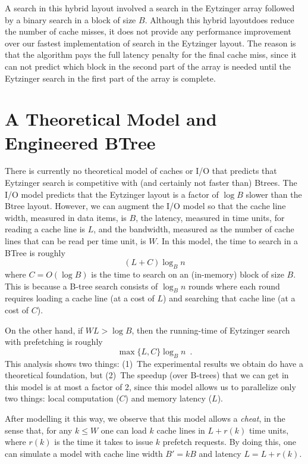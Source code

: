 \documentclass{patmorin}
\begin{document}
A search in this hybrid layout involved a search in the Eytzinger array
followed by a binary search in a block of size $B$.  Although this hybrid
layoutdoes reduce the number of cache misses, it does not provide any
performance improvement over our fastest implementation of search in the
Eytzinger layout. The reason is that the algorithm pays the full latency
penalty for the final cache miss, since it can not predict which block
in the second part of the array is needed until the Eytzinger search in
the first part of the array is complete.

\section{A Theoretical Model and Engineered BTree}

There is currently no theoretical model of caches or I/O that predicts
that Eytzinger search is competitive with (and certainly not faster than)
Btrees.  The I/O model \cite{aggarwal.vitter:input} predicts that the
Eytzinger layout is a factor of $\log B$ slower than the Btree layout.
However, we can augment the I/O model so that the cache line width,
measured in data items, is $B$, the latency, measured in time units, for
reading a cache line is $L$, and the bandwidth, measured as the number
of cache lines that can be read per time unit, is $W$.  In this model,
the time to search in a BTree is roughly
\[
     (L+C)\log_B n
\]
where $C=O(\log B)$ is the time to search on an (in-memory) block
of size $B$.  This is because a B-tree search consists of $\log_B n$
rounds where each round requires loading a cache line (at a cost of $L$)
and searching that cache line (at a cost of $C$).

On the other hand, if $WL > \log B$, then the running-time of Eytzinger
search with prefetching is roughly
\[
    \max\{L,C\}\log_B n \enspace .
\]
This analysis shows two things: (1)~The experimental results we obtain do
have a theoretical foundation, but (2)~The speedup (over B-trees) that we
can get in this model is at most a factor of 2, since this model allows us
to parallelize only two things: local computation ($C$) and memory latency
($L$).

After modelling it this way, we observe that this model allows a
\emph{cheat}, in the sense that, for any $k\le W$ one can load $k$
cache lines in $L+r(k)$ time units, where $r(k)$ is the time it takes
to issue $k$ prefetch requests.  By doing this, one can simulate a model
with cache line width $B'=kB$ and latency $L=L+r(k)$.  
\end{document}
